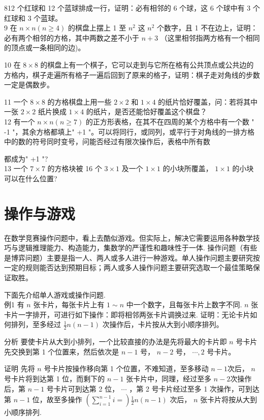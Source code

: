\documentclass[10pt]{article}
\begin{document}
812 个红球和 12 个蓝球排成一行，证明：必有相邻的 6 个球，这 6 个球中有 3 个红球和 3 个蓝球。\\
9 在 $n \times n(n \geqslant 4)$ 的棋盘上摆上 1 至 $n^{2}$ 这 $n^{2}$ 个数字，且 1 不在边上，证明：必有两个相邻的方格，其中两数之差不小于 $n+3$ （这里相邻指两方格有一个相同的顶点或一条相同的边)。

10 在 $8 \times 8$ 的棋盘上有一个棋子，它可以走到与它所在格有公共顶点或公共边的方格内，棋子走遍所有格子一遍后回到了原来的格子，证明：棋子走对角线的步数一定是偶数步。

11 一个 $8 \times 8$ 的方格棋盘上用一些 $2 \times 2$ 和 $1 \times 4$ 的纸片恰好覆盖，问：若将其中一张 $2 \times 2$ 纸片换成 $1 \times 4$ 的纸片，是否还能恰好覆盖这个棋盘？\\
12 有一个 $n \times n(n \geqslant 7)$ 的正方形表格，在其不在四周的某个方格中有一个数 " -1 "，其余方格都填上" +1 "。可以将同行，或同列，或平行于对角线的一排方格中的数的符号同时变号，问能否经过有限次操作后，表格中所有数

都成为" +1 "?\\
13 一个 $7 \times 7$ 的方格块被 16 个 $3 \times 1$ 及一个 $1 \times 1$ 的小块所覆盖， $1 \times 1$ 的小块可以在什么位置?

\section{操作与游戏}
在数学竞赛操作问题中，看上去酷似游戏。但实际上，解决它需要运用各种数学技巧与逻辑推理能力、构造能力，集数学的严谨性和趣味性于一体. 操作问题（有些是博弈问题）主要是指一人、两人或多人进行一种游戏。单人操作问题主要研究按一定的规则能否达到预期目标；两人或多人操作问题主要研究选取一个最佳策略保证取胜。

下面先介绍单人游戏或操作问题.\\
例1 有 $n$ 张卡片，每张卡片上有 $1 \sim n$ 中一个数字，且每张卡片上数字不同. $n$ 张卡片一字排开，可进行如下操作：即将相邻两张卡片调换过来. 证明：无论卡片如何排列，至多经过 $\frac{1}{2} n(n-1)$ 次操作后，卡片按从大到小顺序排列。

分析 要使卡片从大到小排列，一个比较直接的办法是先将最大的卡片即 $n$ 号卡片先交换到第 1 个位置来，然后依次是 $n-1$ 号， $n-2$ 号， $\cdots, 2$ 号卡片。

证明 先将 $n$ 号卡片按操作移向第 1 个位置，不难知道，至多移动 $n-1$次后， $n$ 号卡片将到达第 1 位，而剩下的 $n-1$ 张卡片中，同理，经过至多 $n-2$次操作后，第 $n-1$ 号卡片可到达第 2 位， $\cdots$ ，第 2 号卡片经过至多 1 次操作，可到达第 $n-1$ 位，故至多操作 $\left(\sum_{i=1}^{n-1} i=\right) \frac{1}{2} n(n-1)$ 次后， $n$ 张卡片将按从大到小顺序排列.
\end{document}
